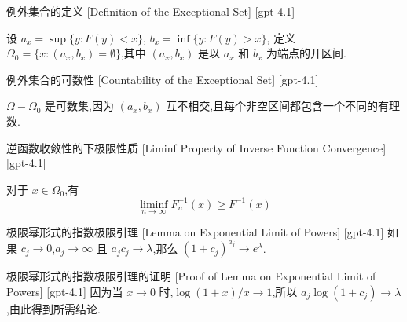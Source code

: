 \documentclass[UTF8]{ctexart}
\begin{document}
    
    
    \begin{dfn}
        {例外集合的定义}
        [Definition of the Exceptional Set]
        [gpt-4.1]
        
设 $a_x = \sup \{ y : F(y) < x \}$, $b_x = \inf \{ y : F(y) > x \}$, 定义 $\Omega_0 = \{ x : (a_x, b_x) = \emptyset \}$,其中 $(a_x, b_x)$ 是以 $a_x$ 和 $b_x$ 为端点的开区间.

    \end{dfn}
    
    
    
    \begin{ppt}
        {例外集合的可数性}
        [Countability of the Exceptional Set]
        [gpt-4.1]
        
$\Omega - \Omega_0$ 是可数集,因为 $(a_x, b_x)$ 互不相交,且每个非空区间都包含一个不同的有理数.

    \end{ppt}
    
    
    
    \begin{thm}
        {逆函数收敛性的下极限性质}
        [Liminf Property of Inverse Function Convergence]
        [gpt-4.1]
        
对于 $x \in \Omega_0$,有
\[
\liminf_{n \to \infty} F_n^{-1}(x) \geq F^{-1}(x)
\]

    \end{thm}
    
    
    
    \begin{lma}
        {极限幂形式的指数极限引理}
        [Lemma on Exponential Limit of Powers]
        [gpt-4.1]
        如果 $c_{j} \to 0$,$a_{j} \to \infty$ 且 $a_{j} c_{j} \to \lambda$,那么 $(1 + c_{j})^{a_{j}} \to e^{\lambda}$.
    \end{lma}
    
    
    
    \begin{prf}
        {极限幂形式的指数极限引理的证明}
        [Proof of Lemma on Exponential Limit of Powers]
        [gpt-4.1]
        因为当 $x \to 0$ 时,$\log(1 + x)/x \to 1$,所以 $a_{j} \log(1 + c_{j}) \to \lambda$,由此得到所需结论.
    \end{prf}
    
\end{document}
